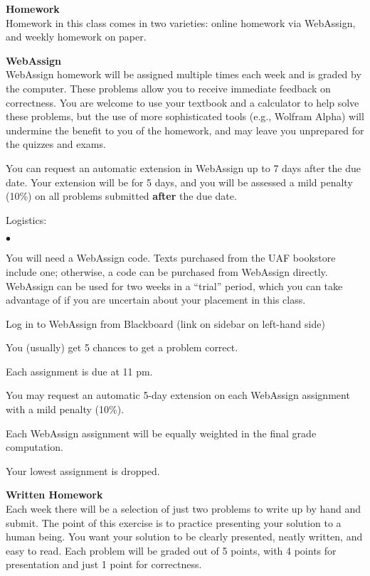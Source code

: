 \documentclass[12pt]{article}
\renewcommand{\emph}[1]{\textsf{\textbf{#1}}}
\newcommand{\localhead}[1]{\par\smallskip\textbf{#1}\nobreak\\}%
\def\heading#1{\localhead{\large\emph{#1}}}
\def\subheading#1{\localhead{\emph{#1}}}
\newenvironment{clist}%
{\bgroup\parskip 0pt\begin{list}{$\bullet$}{\partopsep 4pt\topsep 0pt\itemsep -2pt}}%
{\end{list}\egroup}%
\begin{document}
\heading{Homework}
Homework in this class comes in two varieties: online homework via WebAssign, and weekly homework on paper. %

\subheading{WebAssign} 
WebAssign homework will be assigned multiple times each week and is graded by the computer. These problems allow
you to receive immediate feedback on correctness. %
You are welcome
to use your textbook and a calculator to help solve these problems, but
the use of more sophisticated tools (e.g., Wolfram Alpha) will undermine
the benefit to you of the homework, and may leave you unprepared for
the quizzes and exams.

You can request an automatic extension in WebAssign up to 7 days after the due date. Your extension will be for 5 days, and you will be assessed a mild penalty (10\%) on all problems submitted \emph{after} the due date.

Logistics:

\begin{clist}
\item You will need a WebAssign code.  Texts purchased from the UAF 
bookstore include one; otherwise, a code can be purchased from
WebAssign directly. WebAssign can be used for two weeks in a ``trial''
period, which you can take advantage of if you are uncertain about
your placement in this class.
\item Log in to WebAssign from Blackboard (link on sidebar on left-hand side)
\item You (usually) get 5 chances to get a problem correct. 
\item Each assignment is due at 11 pm. 
\item You may request an automatic 5-day extension on each WebAssign assignment with a mild penalty (10\%).%
\item Each WebAssign assignment will be equally weighted in the final grade computation. 
\item Your lowest assignment is dropped.
\end{clist}


\subheading{Written Homework}
Each week there will be a selection of just two problems to write up
by hand and submit.  The point of this exercise is to 
practice presenting your solution to a human being.  You want
your solution to be clearly presented, neatly written, and easy to read.  Each problem will be graded out of 5 points,
with 4 points for presentation and just 1 point for correctness.
\end{document}
